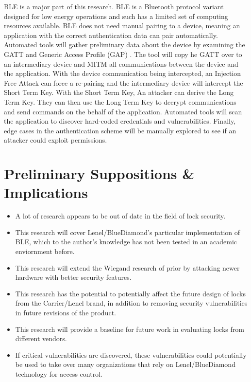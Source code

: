 \documentclass[10pt,twocolumn,letterpaper]{article}
\begin{document}
BLE is a major part of this research. BLE is a Bluetooth protocol variant designed for low energy operations and such has a limited set of computing resources available. BLE does not need manual pairing to a device, meaning an application with the correct authentication data can pair automatically. Automated tools will gather preliminary data about the device by examining the GATT and Generic Access Profile (GAP) . The tool will copy he GATT over to an intermediary device and MITM all communications between the device and the application. With the device communication being intercepted, an Injection Free Attack can force a re-pairing and the intermediary device will intercept the Short Term Key. With the Short Term Key,  An attacker can derive the Long Term Key. They can then use the Long Term Key to decrypt communications and send commands on the behalf of the application. Automated tools will scan the application to discover hard-coded credentials and vulnerabilities. Finally, edge cases in the authentication scheme will be manually explored to see if an attacker could exploit permissions.


\section{Preliminary Suppositions \& Implications}
\begin{itemize}
    \item A lot of research appears to be out of date in the field of lock security.
    \item This research will cover Lenel/BlueDiamond's particular implementation of BLE, which to the author's knowledge has not been tested in an academic enviornment before.
    \item This research will extend the Wiegand research of prior by attacking newer hardware with better security features.
    \item This research has the potential to potentially affect the future design of locks from the Carrier/Lenel brand, in addition to removing security vulnerabilities in future revisions of the product.
    \item This research will provide a baseline for future work in evaluating locks from different vendors.
    \item If critical vulnerabilities are discovered, these vulnerabilities could potentially be used to take over many organizations that rely on Lenel/BlueDiamond technology for access control. 
\end{itemize}
 
\end{document}
